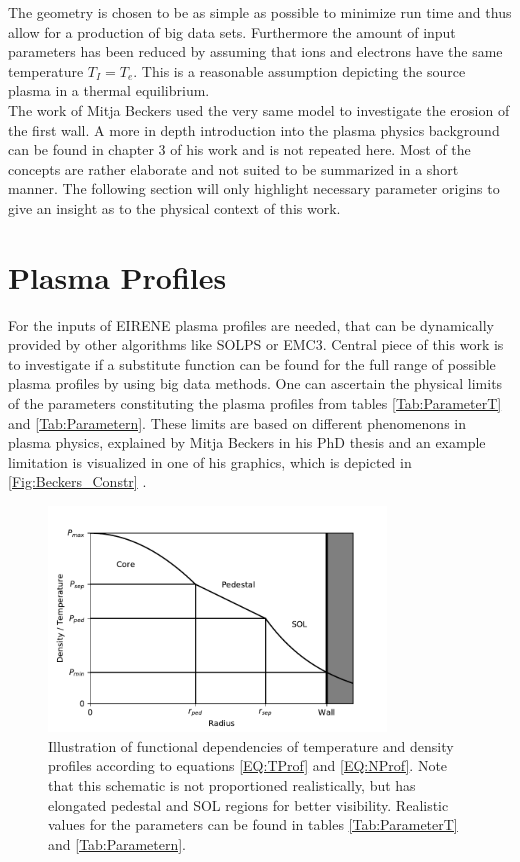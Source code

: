 		The geometry is chosen to be as simple as possible to minimize run time and thus allow for a production of big data sets. Furthermore the amount of input parameters has been reduced by assuming that ions and electrons have the same temperature $T_I =T_e$. This is a reasonable assumption depicting the source plasma in a thermal equilibrium.\\		
		The work of Mitja Beckers \cite{Beckers} used the very same model to investigate the erosion of the first wall. A more in depth introduction into the plasma physics background can be found in chapter 3 of his work and is not repeated here. Most of the concepts are rather elaborate and not suited to be summarized in a short manner. The following section will only highlight necessary parameter origins to give an insight as to the physical context of this work.
		
	\section{Plasma Profiles}
		For the inputs of EIRENE plasma profiles are needed, that can be dynamically provided by other algorithms like SOLPS or EMC3. Central piece of this work is to investigate if a substitute function can be found for the full range of possible plasma profiles by using big data methods. One can ascertain the physical limits of the parameters constituting the plasma profiles from tables \ref{Tab:ParameterT} and \ref{Tab:Parametern}. These limits are based on different phenomenons in plasma physics, explained by Mitja Beckers in his PhD thesis \cite{Beckers} and an example limitation is visualized in one of his graphics, which is depicted in \ref{Fig:Beckers_Constr} .\\
		
		\begin{figure}
			\centering
			\includegraphics[width=0.8\textwidth]{./images/DensityPlot.pdf}
			\caption{Illustration of functional dependencies of temperature and density profiles according to equations \ref{EQ:TProf} and \ref{EQ:NProf}. Note that this schematic is not proportioned realistically, but has elongated pedestal and SOL regions for better visibility. Realistic values for the parameters can be found in tables \ref{Tab:ParameterT} and \ref{Tab:Parametern}.}
			\label{Fig:PlasmaProfile}
		\end{figure}
		

